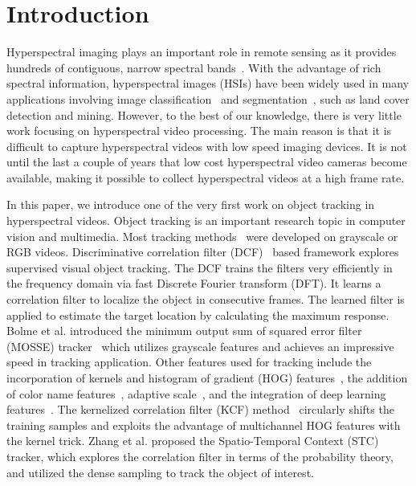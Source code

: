 \documentclass[runningheads,a4paper]{llncs}
\begin{document}
\section{Introduction}

Hyperspectral imaging plays an important role in remote sensing as it provides hundreds of contiguous, narrow spectral bands~\cite{HSI}. With the advantage of rich spectral information, hyperspectral images (HSIs) have been widely used in many applications involving image classification~\cite{a1} and segmentation~\cite{a2}, such as land cover detection and mining. However, to the best of our knowledge, there is very little work focusing on hyperspectral video processing. The main reason is that it is difficult to capture hyperspectral videos with low speed imaging devices. It is not until the last a couple of years that low cost hyperspectral video cameras become available, making it possible to collect hyperspectral videos at a high frame rate.

In this paper, we introduce one of the very first work on object tracking in hyperspectral videos. Object tracking is an important research topic in computer vision and multimedia. Most tracking methods~\cite{CN,ESK,KCF,STC,DLT} were developed on grayscale or RGB videos. Discriminative correlation filter (DCF)~\cite{CN,ESK,KCF,MOSSE} based framework explores supervised visual object tracking. The DCF trains the filters very efficiently in the frequency domain via fast Discrete Fourier transform (DFT). It learns a correlation filter to localize the object in consecutive frames. The learned filter is applied to estimate the target location by calculating the maximum response. Bolme et al. introduced the minimum output sum of squared error filter (MOSSE) tracker~\cite{MOSSE} which utilizes grayscale features and achieves an impressive speed in tracking application. Other features used for tracking include the incorporation of kernels and histogram of gradient (HOG) features~\cite{KCF}, the addition of color name features~\cite{CN}, adaptive scale~\cite{a4}, and the integration of deep learning features~\cite{a5}. The kernelized correlation filter (KCF) method~\cite{KCF} circularly shifts the training samples and exploits the advantage of multichannel HOG features with the kernel trick. Zhang et al. proposed the Spatio-Temporal Context (STC)~\cite{STC} tracker, which explores the correlation filter in terms of the probability theory, and utilized the dense sampling to track the object of interest.
\end{document}
